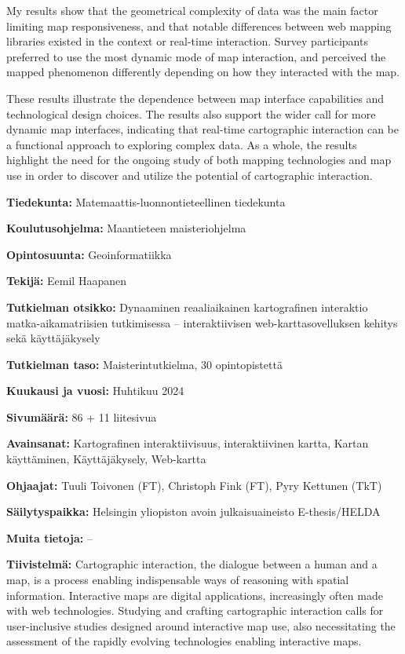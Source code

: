 \begin{spacing}{1}
My results show that the geometrical complexity of data was the main factor limiting
map responsiveness, and that notable differences between web mapping libraries existed
in the context or real-time interaction.
Survey participants preferred to use the most dynamic mode of map interaction,
and perceived the mapped phenomenon differently depending on how they interacted with the map.

These results illustrate the dependence between map interface capabilities and technological design choices.
The results also support the wider call for more dynamic map interfaces,
indicating that real-time cartographic interaction can be a functional approach to exploring complex data.
As a whole, the results highlight the need for the ongoing study of both mapping technologies and map use
in order to discover and utilize the potential of cartographic interaction.

\newpage

\textbf{Tiedekunta:} Matemaattis-luonnontieteellinen tiedekunta

\textbf{Koulutusohjelma:} Maantieteen maisteriohjelma

\textbf{Opintosuunta:} Geoinformatiikka

\textbf{Tekijä:} Eemil Haapanen

\textbf{Tutkielman otsikko:} Dynaaminen reaaliaikainen kartografinen interaktio matka-aikamatriisien tutkimisessa --
interaktiivisen web-karttasovelluksen kehitys sekä käyttäjäkysely

\textbf{Tutkielman taso:} Maisterintutkielma, 30 opintopistettä

\textbf{Kuukausi ja vuosi:} Huhtikuu 2024  %

\textbf{Sivumäärä:} 86 + 11 liitesivua  %

\textbf{Avainsanat:} Kartografinen interaktiivisuus, interaktiivinen kartta, Kartan käyttäminen, Käyttäjäkysely, Web-kartta

\textbf{Ohjaajat:} Tuuli Toivonen (FT), Christoph Fink (FT), Pyry Kettunen (TkT)

\textbf{Säilytyspaikka:} Helsingin yliopiston avoin julkaisuaineisto E-thesis/HELDA

\textbf{Muita tietoja:} --

\textbf{Tiivistelmä:} Cartographic interaction, the dialogue between a human and a map, is
a process enabling indispensable ways of reasoning with spatial information.
Interactive maps are digital applications,
increasingly often made with web technologies.
Studying and crafting cartographic interaction calls for
user-inclusive studies designed around interactive map use,
also necessitating the assessment of the rapidly evolving technologies enabling interactive maps.


\end{spacing}
